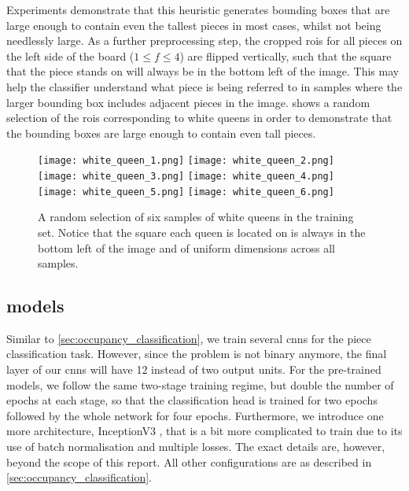 \documentclass[../main.tex]{subfiles}
\begin{document}
Experiments demonstrate that this heuristic generates bounding boxes that are large enough to contain even the tallest pieces in most cases, whilst not being needlessly large.
As a further preprocessing step, the cropped \glspl{roi} for all pieces on the left side of the board ($1 \leq f \leq 4$) are flipped vertically, such that the square that the piece stands on will always be in the bottom left of the image.
This may help the classifier understand what piece is being referred to in samples where the larger bounding box includes adjacent pieces in the image.
 shows a random selection of the \glspl{roi} corresponding to white queens in order to demonstrate that the bounding boxes are large enough to contain even tall pieces.
\begin{figure}
    \centering
    \texttt{[image: white\_queen\_1.png]}
    \texttt{[image: white\_queen\_2.png]}
    \texttt{[image: white\_queen\_3.png]}
    \texttt{[image: white\_queen\_4.png]}
    \texttt{[image: white\_queen\_5.png]}
    \texttt{[image: white\_queen\_6.png]}
    \caption[A random selection of six samples of white queens in the training set.]{A random selection of six samples of white queens in the training set. Notice that the square each queen is located on is always in the bottom left of the image and of uniform dimensions across all samples.}
    \label{fig:white_queens}
\end{figure}

\subsection{ models}
Similar to \cref{sec:occupancy_classification}, we train several \glspl{cnn} for the piece classification task.
However, since the problem is not binary anymore, the final layer of our \glspl{cnn} will have 12 instead of two output units.
For the pre-trained models, we follow the same two-stage training regime, but double the number of epochs at each stage, so that the classification head is trained for two epochs followed by the whole network for four epochs.
Furthermore, we introduce one more architecture, InceptionV3 \cite{szegedy2016}, that is a bit more complicated to train due to its use of batch normalisation and multiple losses.
The exact details are, however, beyond the scope of this report.
All other configurations are as described in \cref{sec:occupancy_classification}.
\end{document}
